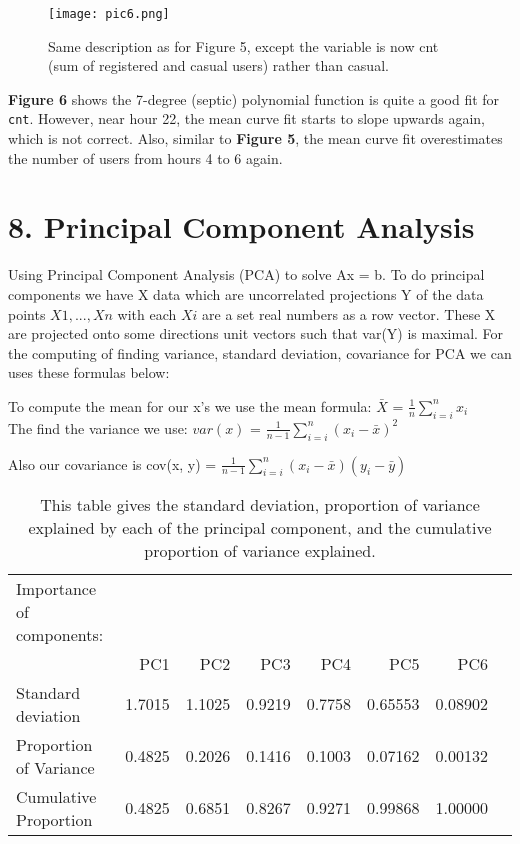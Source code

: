 \documentclass[
]{article}
\begin{document}
\newpage

\begin{figure}
\centering
\texttt{[image: pic6.png]}
\caption{Same description as for Figure 5, except the variable is now cnt (sum of registered and casual users) rather than casual.}
\end{figure}

\textbf{Figure 6} shows the 7-degree (septic) polynomial function is quite a good fit for \texttt{cnt}. However, near hour 22, the mean curve fit starts to slope upwards again, which is not correct. Also, similar to \textbf{Figure 5}, the mean curve fit overestimates the number of users from hours 4 to 6 again.

\hypertarget{principle component analysis}{%
\section{8. Principal Component Analysis }\label{principle componenet analysis}}
Using Principal Component Analysis (PCA) to solve Ax = b. To do principal components we have X data which are uncorrelated projections Y of the data points $X1,
..., Xn$ with each $Xi$ are a set real numbers as a row vector. These X are projected onto some directions unit vectors such that var(Y) is maximal. For the computing of finding variance, standard deviation, covariance for PCA we can uses these formulas below: 

To compute the mean for our x's we use the mean formula: $\bar{X}$ = \( \frac{1}{n} \sum_{i=i}^{n} x_{i} \) \\ 

The find the variance we use: $var(x)$ = \(\frac{1}{n-1} \sum_{i=i}^{n} (x_{i} - \bar{x})^2\)

Also our covariance is cov(x, y) = \(\frac{1}{n-1} \sum_{i=i}^{n} (x_{i} - \bar{x})(y_{i} - \bar{y})\)


\begin{longtable}[]{@{}lrrrrrrr@{}}
\caption{This table gives the standard deviation, proportion of variance explained by each of the principal component, and the cumulative proportion of variance explained.}\tabularnewline
\toprule
Importance of components:\tabularnewline
&PC1 & PC2 &   PC3 &   PC4 &    PC5  &   PC6\tabularnewline
\midrule
\endfirsthead
\toprule
Standard deviation & 1.7015 & 1.1025 & 0.9219 & 0.7758 & 0.65553 & 0.08902\tabularnewline
Proportion of Variance & 0.4825 & 0.2026 & 0.1416 & 0.1003 & 0.07162 & 0.00132\tabularnewline
Cumulative Proportion & 0.4825 & 0.6851 & 0.8267 & 0.9271 & 0.99868 & 1.00000\tabularnewline
\bottomrule
\end{longtable}
\newpage
\end{document}
